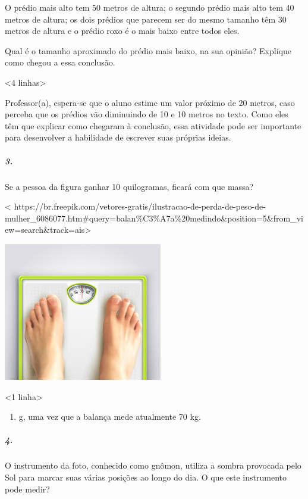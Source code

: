 O prédio mais alto tem 50 metros de altura; o segundo prédio mais alto
tem 40 metros de altura; os dois prédios que parecem ser do mesmo
tamanho têm 30 metros de altura e o prédio roxo é o mais baixo entre
todos eles.

Qual é o tamanho aproximado do prédio mais baixo, na sua opinião?
Explique como chegou a essa conclusão.

\textless{}4 linhas\textgreater{}

Professor(a), espera-se que o aluno estime um valor próximo de 20
metros, caso perceba que os prédios vão diminuindo de 10 e 10 metros no
texto. Como eles têm que explicar como chegaram à conclusão, essa
atividade pode ser importante para desenvolver a habilidade de escrever
suas próprias ideias.

\subparagraph{3.}\label{section-30}

Se a pessoa da figura ganhar 10 quilogramas, ficará com que massa?

\textless{}
https://br.freepik.com/vetores-gratis/ilustracao-de-perda-de-peso-de-mulher\_6086077.htm\#query=balan\%C3\%A7a\%20medindo\&position=5\&from\_view=search\&track=ais\textgreater{}

\includegraphics[width=2.72917in,height=2.37665in]{media/image44.jpeg}

\textless{}1 linha\textgreater{}

\begin{enumerate}
\def\labelenumi{\arabic{enumi}.}
\setcounter{enumi}{80}
\item
  g, uma vez que a balança mede atualmente 70 kg.
\end{enumerate}

\subparagraph{4.}\label{section-31}

O instrumento da foto, conhecido como gnômon, utiliza a sombra
provocada pelo Sol para marcar suas várias posições ao longo do dia. O
que este instrumento pode medir?

